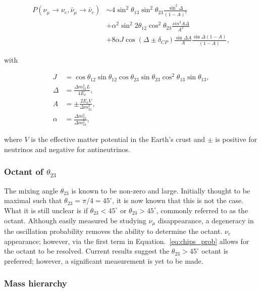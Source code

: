 \begin{align} %
    P(\nu_{\mu}\rightarrow\nu_{e},\bar{\nu}_{\mu}\rightarrow\bar{\nu}_{e})
     & \sim4\sin^{2}\theta_{13}\sin^{2}\theta_{23}\frac{\sin^{2}\Delta}{(1-A)^{2}} \nonumber     \\
     & + \alpha^{2}\sin^{2}2\theta_{12}\cos^{2}\theta_{23}\frac{sin^{2}A\Delta}{A^{2}} \nonumber \\
     & + 8\alpha J\cos(\Delta\pm\delta_{CP})\frac{\sin\Delta A}{A}\frac{\sin\Delta(1-A)}{(1-A)},
    \label{eq:chips_prob}
\end{align}

with

\begin{align} %
    J      & = \cos\theta_{12}\sin\theta_{12}\cos\theta_{23}
    \sin\theta_{23}\cos^{2}\theta_{13}\sin\theta_{13},       \\
    \Delta & = \frac{\Delta m^{2}_{31}L}{4E_{\nu}},          \\
    A      & = \pm\frac{2E_{\nu}V}{\Delta m^{2}_{31}},       \\
    \alpha & = \frac{\Delta m^{2}_{21}}{\Delta m^{2}_{31}},
    \label{eq:chips_prob_parts}
\end{align}

where $V$ is the effective matter potential in the Earth's crust and $\pm$ is positive for
neutrinos and negative for antineutrinos.

\subsubsection*{Octant of $\theta_{23}$} %

The mixing angle $\theta_{23}$ is known to be non-zero and large. Initially thought to be maximal
such that $\theta_{23}=\pi/4=45^{\circ}$, it is now known that this is not the case. What it is
still unclear is if $\theta_{23}<45^{\circ}$ or $\theta_{23}>45^{\circ}$, commonly referred to as
the octant. Although easily measured be studying $\nu_{\mu}$ disappearance, a degeneracy in the
oscillation probability removes the ability to determine the octant. $\nu_{e}$ appearance;
however, via the first term in Equation.~\ref{eq:chips_prob} allows for the octant to be resolved.
Current results suggest the $\theta_{23}>45^{\circ}$ octant is preferred; however, a significant
measurement is yet to be made.

\subsubsection*{Mass hierarchy} %

